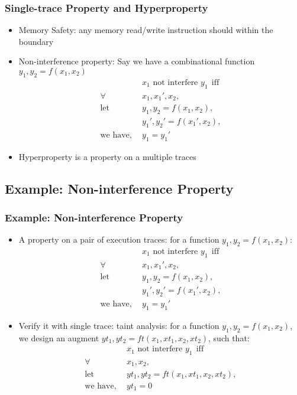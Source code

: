 \documentclass{beamer}
\begin{document}
\begin{frame}
\frametitle{Single-trace Property and Hyperproperty}
\begin{itemize}
  \item<1-> Memory Safety: any memory read/write instruction should within the boundary
  \item<2-> Non-interference property: Say we have a combinational function $y_1, y_2 = f(x_1, x_2)$
  \begin{align*}
    & \text{$x_1$ not interfere $y_1$} ~~ \text{iff} \\
    \forall ~~& x_1, x_1', x_2, \\
    \text{let} ~~& y_1, y_2 = f(x_1, x_2), \\
    ~~~~~~& y_1', y_2' = f(x_1', x_2), \\
    \text{we have}, ~~& y_1 = y_1'
  \end{align*}
  \item<3-> Hyperproperty is a property on a multiple traces
\end{itemize}
\end{frame}



\subsection{Example: Non-interference Property}

\begin{frame}
\frametitle{Example: Non-interference Property}
\begin{itemize}
  \item<1-> A property on a pair of execution traces: for a function $y_1, y_2 = f(x_1, x_2)$:
  \begin{align*}
    & \text{$x_1$ not interfere $y_1$} ~~ \text{iff} \\
    \forall ~~& x_1, x_1', x_2, \\
    \text{let} ~~& y_1, y_2 = f(x_1, x_2), \\
    ~~~~~~& y_1', y_2' = f(x_1', x_2), \\
    \text{we have}, ~~& y_1 = y_1'
  \end{align*}
  \item<2-> Verify it with single trace: taint analysis: for a function $y_1, y_2 = f(x_1, x_2)$, we design an augment $yt_1, yt_2 = ft(x_1, xt_1, x_2, xt_2)$, such that:
  \begin{align*}
    & \text{$x_1$ not interfere $y_1$} ~~ \text{iff} \\
    \forall ~~& x_1, x_2, \\
    \text{let} ~~& yt_1, yt_2 = ft(x_1, xt_1, x_2, xt_2), \\
    \text{we have}, ~~& yt_1 = 0
  \end{align*}
\end{itemize}
\end{frame}
\end{document}
